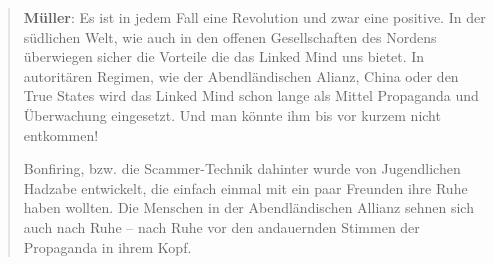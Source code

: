 \documentclass{scrartcl}
\newenvironment{antworta}{
  \begin{quotation}
  }{
  \end{quotation}
}
\newcommand{\name}[1]{\textbf{#1}}
\begin{document}
\begin{antworta}
\name{Müller}: Es ist in jedem Fall eine Revolution und zwar eine
positive. In der südlichen Welt, wie auch in den offenen
Gesellschaften des Nordens überwiegen sicher die Vorteile
die das Linked Mind uns bietet. In autoritären Regimen, wie
der Abendländischen Alianz, China oder den True States wird
das Linked Mind schon lange als Mittel Propaganda und
Überwachung eingesetzt. Und man könnte ihm bis vor kurzem
nicht entkommen!

Bonfiring, bzw. die Scammer-Technik dahinter wurde von
Jugendlichen Hadzabe entwickelt, die einfach einmal mit ein
paar Freunden ihre Ruhe haben wollten. Die Menschen in der
Abendländischen Allianz sehnen sich auch nach Ruhe – nach
Ruhe vor den andauernden Stimmen der Propaganda in ihrem
Kopf.
\end{antworta}
\end{document}
